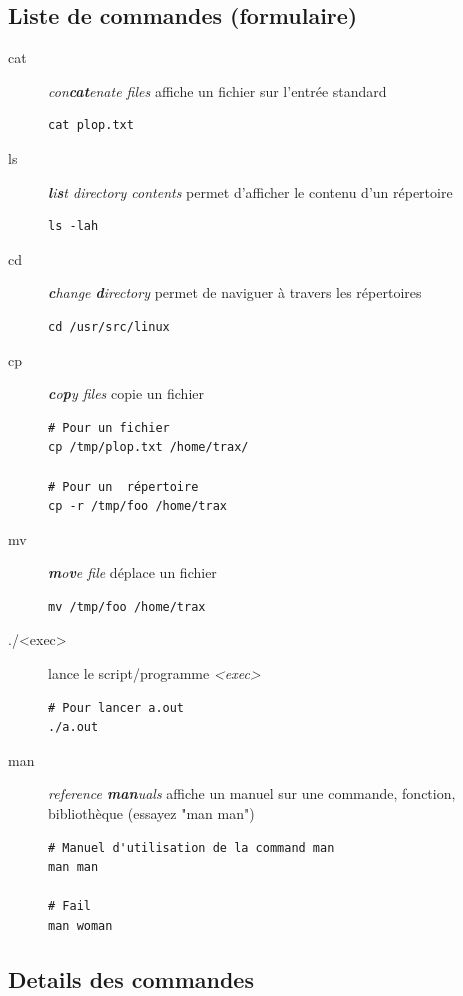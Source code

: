 \documentclass[french, a4paper, 12pt, titlepage]{article}
\begin{document}
\subsection{Liste de commandes (formulaire)}
\begin{description}
\item[cat] \emph{con\textbf{cat}enate files} affiche un fichier sur l'entrée standard
  \begin{lstlisting}
cat plop.txt
  \end{lstlisting}
\item[ls] \emph{\textbf{l}i\textbf{s}t directory contents} permet d'afficher le contenu d'un répertoire
  \begin{lstlisting}
ls -lah 
  \end{lstlisting}
\item[cd] \emph{\textbf{c}hange \textbf{d}irectory} permet de naviguer à travers les répertoires
  \begin{lstlisting}
cd /usr/src/linux    
  \end{lstlisting}
\item[cp] \emph{\textbf{c}o\textbf{p}y files} copie un fichier
  \begin{lstlisting}
# Pour un fichier
cp /tmp/plop.txt /home/trax/

# Pour un  répertoire
cp -r /tmp/foo /home/trax
  \end{lstlisting}
\item[mv] \emph{\textbf{m}o\textbf{v}e file} déplace un fichier
  \begin{lstlisting}
mv /tmp/foo /home/trax    
  \end{lstlisting}
\item[./<exec>] lance le script/programme \emph{<exec>}
  \begin{lstlisting}
# Pour lancer a.out
./a.out    
  \end{lstlisting}
\item[man] \emph{reference \textbf{man}uals} affiche un manuel sur une commande, fonction, bibliothèque (essayez "man man")
  \begin{lstlisting}
# Manuel d'utilisation de la command man
man man

# Fail
man woman
  \end{lstlisting}
\end{description}

\subsection{Details des commandes}







\end{document}
